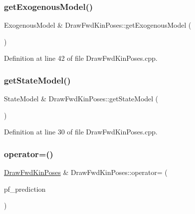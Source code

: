\subsubsection{\texorpdfstring{get\+Exogenous\+Model()}{getExogenousModel()}}
{\footnotesize\ttfamily Exogenous\+Model \& Draw\+Fwd\+Kin\+Poses\+::get\+Exogenous\+Model (\begin{DoxyParamCaption}{ }\end{DoxyParamCaption})\hspace{0.3cm}{\ttfamily [override]}}



Definition at line 42 of file Draw\+Fwd\+Kin\+Poses.\+cpp.

\mbox{\label{classbfl_1_1DrawFwdKinPoses_a3273b9ac31c6a5cec5a3d76a498b82b8}} 
\subsubsection{\texorpdfstring{get\+State\+Model()}{getStateModel()}}
{\footnotesize\ttfamily State\+Model \& Draw\+Fwd\+Kin\+Poses\+::get\+State\+Model (\begin{DoxyParamCaption}{ }\end{DoxyParamCaption})\hspace{0.3cm}{\ttfamily [override]}}



Definition at line 30 of file Draw\+Fwd\+Kin\+Poses.\+cpp.

\mbox{\label{classbfl_1_1DrawFwdKinPoses_af3c60f95018e80c15816c0e7ec4b75c7}} 
\subsubsection{\texorpdfstring{operator=()}{operator=()}}
{\footnotesize\ttfamily \hyperlink{classbfl_1_1DrawFwdKinPoses}{Draw\+Fwd\+Kin\+Poses} \& Draw\+Fwd\+Kin\+Poses\+::operator= (\begin{DoxyParamCaption}\item[{\hyperlink{classbfl_1_1DrawFwdKinPoses}{Draw\+Fwd\+Kin\+Poses} \&\&}]{pf\+\_\+prediction }\end{DoxyParamCaption})\hspace{0.3cm}{\ttfamily [noexcept]}}



